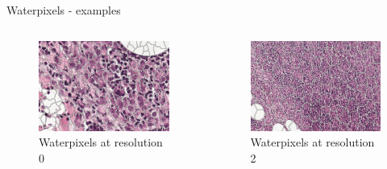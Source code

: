 \documentclass{beamer}
\begin{document}
\begin{frame}{Waterpixels - examples}
\begin{columns}[T] %

\begin{column}{.3\textwidth}
\begin{figure}[!ht]
\centering
\includegraphics[width=\textwidth]{waterpix_res0.png}
\caption{Waterpixels at resolution 0}
\label{}
\end{figure}
\end{column}%

\begin{column}{.3\textwidth}
\begin{figure}[!ht]
\centering
\includegraphics[width=\textwidth]{waterpix_res2.png}
\caption{Waterpixels at resolution 2}
\label{}
\end{figure}
\end{column}%


\end{columns}
\end{frame}
\end{document}
